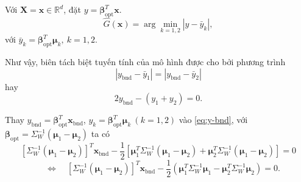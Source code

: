 Với $\bm{X}=\bm{x} \in \mathbb{R}^d$, đặt $y=\bm{\beta}_{\text{opt}}^T\bm{x}$.
\[
\widehat{G}(\bm{x})
=
\arg\min_{k=1,2}
\left|y-\bar{y}_k\right|,
\]
với $\bar{y}_k=\bm{\beta}_{\text{opt}}^T\bm{\mu}_k,\ k=1,2$.

Như vậy, biên tách biệt tuyến tính của mô hình được cho bởi phương trình
\[
\left|y_{\text{bnd}}-\bar{y}_1\right|
=
\left|y_{\text{bnd}}-\bar{y}_2\right|
\]
hay
\begin{equation}
	2y_{\text{bnd}}-\left(y_1+y_2\right)=0.
	\label{eq:y-bnd}
\end{equation}

Thay $y_{\text{bnd}}=\bm{\beta}_{\text{opt}}^T\bm{x}_{\text{bnd}}$, $y_k=\bm{\beta}_{\text{opt}}^T\bm{\mu}_k \ (k=1,2)$ vào \eqref{eq:y-bnd}, với $\bm{\beta}_{\text{opt}}
=
\Sigma_W^{-1}(\bm{\mu}_1-\bm{\mu}_2)$ ta có
\[
\left[\Sigma_W^{-1}(\bm{\mu}_1-\bm{\mu}_2)\right]^T
\bm{x}_{\text{bnd}}
-
\frac{1}{2}
\left[
\bm{\mu}_1^T\Sigma_W^{-1}(\bm{\mu}_1-\bm{\mu}_2)
+
\bm{\mu}_2^T\Sigma_W^{-1}(\bm{\mu}_1-\bm{\mu}_2)
\right]
=
0
\]
\begin{equation}
	\quad \Longleftrightarrow \quad
	\left[\Sigma_W^{-1}(\bm{\mu}_1-\bm{\mu}_2)\right]^T
	\bm{x}_{\text{bnd}}
	-
	\frac{1}{2}
	\left(
	\bm{\mu}_1^T\Sigma_W^{-1}\bm{\mu}_1
	-
	\bm{\mu}_2^T\Sigma_W^{-1}\bm{\mu}_2
	\right)
	=
	0.
	\label{eq:class}
\end{equation}

























